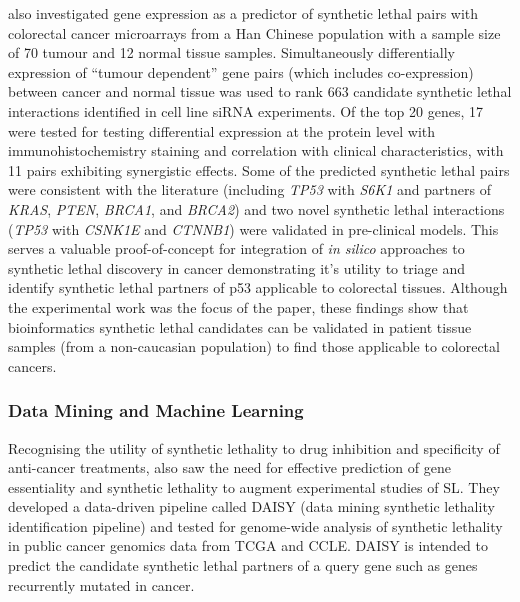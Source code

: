 \citet{Tiong2014} also investigated gene expression as a predictor of synthetic lethal pairs with colorectal cancer microarrays from a Han Chinese population with a sample size of 70 tumour and 12 normal tissue samples. Simultaneously differentially expression of ``tumour dependent'' gene pairs (which includes co-expression) between cancer and normal tissue was used to rank 663 candidate synthetic lethal interactions identified in cell line siRNA experiments. Of the top 20 genes, 17 were tested for testing differential expression at the protein level with immunohistochemistry staining and correlation with clinical characteristics, with 11 pairs exhibiting synergistic effects. Some of the predicted synthetic lethal pairs were consistent with the literature (including \textit{TP53} with \textit{S6K1} and partners of \textit{KRAS},  \textit{PTEN}, \textit{BRCA1}, and \textit{BRCA2}) and two novel synthetic lethal interactions (\textit{TP53} with \textit{CSNK1E} and \textit{CTNNB1}) were validated in pre-clinical models. This serves a valuable proof-of-concept for integration of \textit{in silico} approaches to synthetic lethal discovery in cancer demonstrating it's utility to triage and identify synthetic lethal partners of p53 applicable to colorectal tissues. Although the experimental work was the focus of the paper, these findings show that bioinformatics synthetic lethal candidates can be validated in patient tissue samples (from a non-caucasian population) to find those applicable to colorectal cancers.

\subsubsection{Data Mining and Machine Learning}

Recognising the utility of synthetic lethality to drug inhibition and specificity of anti-cancer treatments, \citet{Jerby2014} also saw the need for effective prediction of gene essentiality and synthetic lethality to augment experimental studies of SL. They developed a data-driven pipeline called DAISY (data mining synthetic lethality identification pipeline) and tested for genome-wide analysis of synthetic lethality in public cancer genomics data from TCGA and CCLE. DAISY is intended to predict the candidate synthetic lethal partners of a query gene such as genes recurrently mutated in cancer.  

